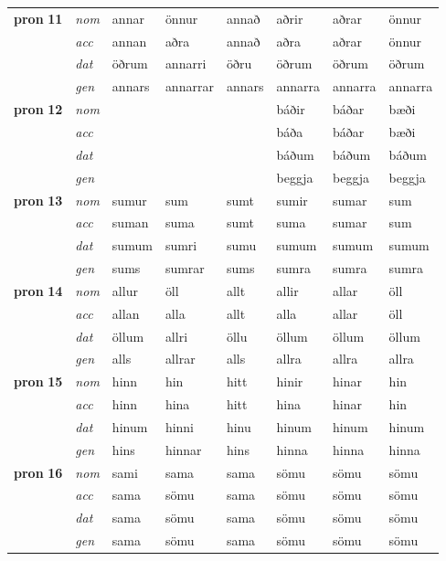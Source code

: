 \begin{longtable}[l]{X>{\footnotesize\itshape}XXXXXXX}
\multirow{3}{*}{{{\textbf{pron} \Large{\textbf{11}}}}}  & nom & annar & önnur    & annað & aðrir & aðrar & önnur \\*
  & acc &  annan  & aðra   & annað & aðra & aðrar & önnur \\*
&  dat & öðrum & annarri   & öðru & öðrum & öðrum & öðrum \\*
  & gen & annars  & annarrar  & annars & annarra & annarra & annarra\\
\cmidrule{1-8}

\multirow{3}{*}{{{\textbf{pron} \Large{\textbf{12}}}}}  & nom &  &     &  & báðir & báðar & bæði \\*
  & acc &    &    &  & báða & báðar & bæði \\*
&  dat &  &    &  & báðum & báðum & báðum \\*
  & gen &   &   &  & beggja & beggja & beggja\\
\cmidrule{1-8}

\multirow{3}{*}{{{\textbf{pron} \Large{\textbf{13}}}}}  & nom & sumur & sum    & sumt & sumir & sumar & sum \\*
  & acc &  suman  & suma   & sumt & suma & sumar & sum \\*
&  dat & sumum & sumri   & sumu & sumum & sumum & sumum \\*
  & gen & sums  & sumrar  & sums & sumra & sumra & sumra\\
\cmidrule{1-8}

\multirow{3}{*}{{{\textbf{pron} \Large{\textbf{14}}}}}  & nom & allur & öll    & allt & allir & allar & öll \\*
  & acc &  allan  & alla   & allt & alla & allar & öll \\*
&  dat & öllum & allri   & öllu & öllum & öllum & öllum \\*
  & gen & alls  & allrar  & alls & allra & allra & allra\\
\cmidrule{1-8}

\multirow{3}{*}{{{\textbf{pron} \Large{\textbf{15}}}}}  & nom & hinn & hin    & hitt & hinir & hinar & hin \\*
  & acc &  hinn  & hina   & hitt & hina & hinar & hin \\*
&  dat & hinum & hinni   & hinu & hinum & hinum & hinum \\*
  & gen & hins  & hinnar  & hins & hinna & hinna & hinna\\
\cmidrule{1-8}

\multirow{3}{*}{{{\textbf{pron} \Large{\textbf{16}}}}}  & nom & sami & sama    & sama & sömu & sömu & sömu \\*
  & acc &  sama  & sömu   & sama & sömu & sömu & sömu \\*
&  dat & sama & sömu   & sama & sömu & sömu & sömu \\*
  & gen & sama  & sömu  & sama & sömu & sömu & sömu\\
\cmidrule{1-8}

\bottomrule
\end{longtable}
